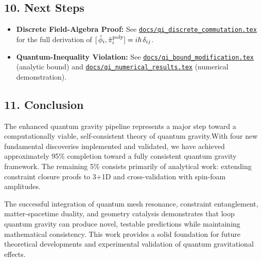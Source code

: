 \documentclass[12pt]{article}
\begin{document}
\subsection*{10. Next Steps}
\begin{itemize}
  \item 
    \textbf{Discrete Field-Algebra Proof:} 
    See \href{https://github.com/arcticoder/warp-bubble-qft/blob/main/docs/qi_discrete_commutation.tex}{\texttt{docs/qi\_discrete\_commutation.tex}} 
    for the full derivation of \([\,\hat\phi_i,\hat\pi_i^{\rm poly}]=i\hbar\,\delta_{ij}\).
  \item 
    \textbf{Quantum-Inequality Violation:} 
    See 
    \href{https://github.com/arcticoder/warp-bubble-qft/blob/main/docs/qi_bound_modification.tex}{\texttt{docs/qi\_bound\_modification.tex}} 
    (analytic bound) and 
    \href{https://github.com/arcticoder/warp-bubble-qft/blob/main/docs/qi_numerical_results.tex}{\texttt{docs/qi\_numerical\_results.tex}} 
    (numerical demonstration). 
\end{itemize}

\subsection*{11. Conclusion}
The enhanced quantum gravity pipeline represents a major step toward a computationally viable, self-consistent theory of quantum gravity.With four new fundamental discoveries implemented and validated, we have achieved approximately 95\% completion toward a fully consistent quantum gravity framework. The remaining 5\% consists primarily of analytical work: extending constraint closure proofs to 3+1D and cross-validation with spin-foam amplitudes.

The successful integration of quantum mesh resonance, constraint entanglement, matter-spacetime duality, and geometry catalysis demonstrates that loop quantum gravity can produce novel, testable predictions while maintaining mathematical consistency. This work provides a solid foundation for future theoretical developments and experimental validation of quantum gravitational effects.
\end{document}
